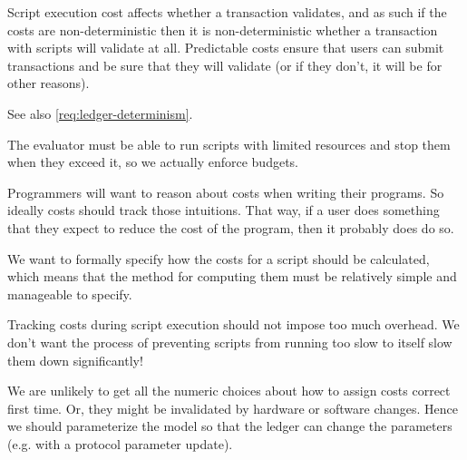 \begin{requirement}[Determinism]
\label{req:costing-determinism}
Script execution cost affects whether a transaction validates, and as such if the costs are non-deterministic then it is non-deterministic whether a transaction with scripts will validate at all.
Predictable costs ensure that users can submit transactions and be sure that they will validate (or if they don't, it will be for other reasons).

See also \cref{req:ledger-determinism}.
\end{requirement}

\begin{requirement}
\label{req:costing-abort}
The evaluator must be able to run scripts with limited resources and stop them when they exceed it, so we actually enforce budgets.
\end{requirement}

\begin{requirement}
\label{req:costing-intuitive}
Programmers will want to reason about costs when writing their programs.
So ideally costs should track those intuitions.
That way, if a user does something that they expect to reduce the cost of the program, then it probably does do so.
\end{requirement}

\begin{requirement}[Specifiablity]
\label{req:costing-specifiable}
We want to formally specify how the costs for a script should be calculated, which means that the method for computing them must be relatively simple and manageable to specify.
\end{requirement}

\begin{requirement}
\label{req:costing-overhead}
Tracking costs during script execution should not impose too much overhead.
We don't want the process of preventing scripts from running too slow to itself slow them down significantly!
\end{requirement}

\begin{requirement}
\label{req:costing-parameters}
We are unlikely to get all the numeric choices about how to assign costs correct first time.
Or, they might be invalidated by hardware or software changes.
Hence we should parameterize the model so that the ledger can change the parameters (e.g. with a protocol parameter update).
\end{requirement}

